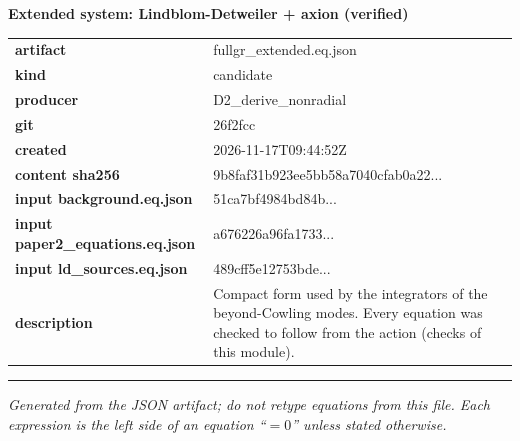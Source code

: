 \documentclass[10pt,a4paper]{article}
\begin{document}
{\Large\bfseries Extended system: Lindblom-Detweiler + axion (verified)}\par
\smallskip
\begin{tabular}{@{}lp{}@{}}\textbf{artifact} & fullgr\_extended.eq.json\\\textbf{kind} & candidate\\\textbf{producer} & D2\_derive\_nonradial\\\textbf{git} & 26f2fcc\\\textbf{created} & 2026-11-17T09:44:52Z\\\textbf{content sha256} & 9b8faf31b923ee5bb58a7040cfab0a22...\\\textbf{input background.eq.json} & 51ca7bf4984bd84b...\\\textbf{input paper2\_equations.eq.json} & a676226a96fa1733...\\\textbf{input ld\_sources.eq.json} & 489cff5e12753bde...\\\textbf{description} & Compact form used by the integrators of the beyond-Cowling modes. Every equation was checked to follow from the action (checks of this module).\\\end{tabular}
\par\medskip\hrule\medskip

\textit{Generated from the JSON artifact; do not retype equations from this file. Each expression is the left side of an equation ``$= 0$'' unless stated otherwise.}\par
\end{document}
